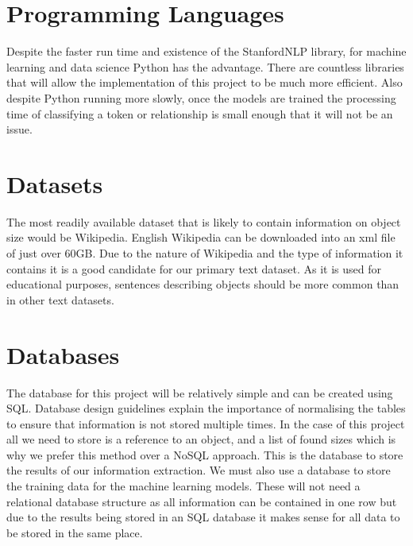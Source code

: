 \section{Programming Languages}
Despite the faster run time and existence of the StanfordNLP library, for machine learning and data science Python has the advantage. There are countless libraries that will allow the implementation of this project to be much more efficient. Also despite Python running more slowly, once the models are trained the processing time of classifying a token or relationship is small enough that it will not be an issue.


\section{Datasets}
The most readily available dataset that is likely to contain information on object size would be Wikipedia. English Wikipedia can be downloaded into an xml file of just over 60GB. Due to the nature of Wikipedia and the type of information it contains it is a good candidate for our primary text dataset. As it is used for educational purposes, sentences describing objects should be more common than in other text datasets.

\section{Databases}

The database for this project will be relatively simple and can be created using SQL. Database design guidelines explain the importance of normalising the tables to ensure that information is not stored multiple times. In the case of this project all we need to store is a reference to an object, and a list of found sizes which is why we prefer this method over a NoSQL approach.
This is the database to store the results of our information extraction. We must also use a database to store the training data for the machine learning models. These will not need a relational database structure as all information can be contained in one row but due to the results being stored in an SQL database it makes sense for all data to be stored in the same place.
